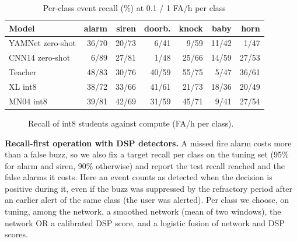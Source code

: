 \documentclass[conference]{IEEEtran}
\begin{document}
\begin{table}[t]\centering\caption{Per-class event recall (\%) at 0.1 / 1 FA/h per class}\label{tab:cls}
\setlength{\tabcolsep}{2.2pt}
\begin{tabular}{lrrrrrr}\toprule
Model & alarm & siren & doorb. & knock & baby & horn \\ \midrule
YAMNet zero-shot & 36/70 & 20/73 & 6/41 & 9/59 & 11/42 & 1/47 \\
CNN14 zero-shot & 6/89 & 27/81 & 1/48 & 25/66 & 14/59 & 27/53 \\
Teacher & 48/83 & 30/76 & 40/59 & 55/75 & 5/47 & 36/61 \\
XL int8 & 38/72 & 33/66 & 41/61 & 21/73 & 18/36 & 20/49 \\
MN04 int8 & 39/81 & 42/69 & 31/59 & 45/71 & 9/41 & 27/54 \\ \bottomrule
\end{tabular}\end{table}

\begin{figure}[t]\centering
{}
\caption{Recall of int8 students against compute (FA/h per class).}\label{fig:size}\end{figure}

\textbf{Recall-first operation with DSP detectors.} A missed fire alarm costs more than a
false buzz, so we also fix a target recall per class on the tuning set (95\% for alarm and siren,
90\% otherwise) and report the test recall reached and the false alarms it costs. Here an event
counts as detected when the decision is positive during it, even if the buzz was suppressed by
the refractory period after an earlier alert of the same class (the user was alerted). Per class
we choose, on tuning, among the network, a smoothed network (mean of two windows), the network OR
a calibrated DSP score, and a logistic fusion of network and DSP scores.
\end{document}
